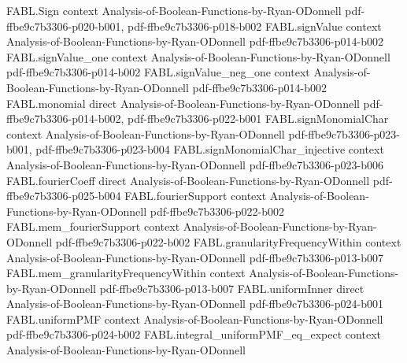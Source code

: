\begin{theorem}
\label{FABL.FiniteFourierBasis.fourierCoeff_coordinateProjection}
\leanok
{}
\proofstep
  {FABL.Sign}
  {context}
  {Analysis-of-Boolean-Functions-by-Ryan-ODonnell}
  {pdf-ffbe9c7b3306-p020-b001,
    pdf-ffbe9c7b3306-p018-b002}
\proofstep
  {FABL.signValue}
  {context}
  {Analysis-of-Boolean-Functions-by-Ryan-ODonnell}
  {pdf-ffbe9c7b3306-p014-b002}
\proofstep
  {FABL.signValue_one}
  {context}
  {Analysis-of-Boolean-Functions-by-Ryan-ODonnell}
  {pdf-ffbe9c7b3306-p014-b002}
\proofstep
  {FABL.signValue_neg_one}
  {context}
  {Analysis-of-Boolean-Functions-by-Ryan-ODonnell}
  {pdf-ffbe9c7b3306-p014-b002}
\proofstep
  {FABL.monomial}
  {direct}
  {Analysis-of-Boolean-Functions-by-Ryan-ODonnell}
  {pdf-ffbe9c7b3306-p014-b002,
    pdf-ffbe9c7b3306-p022-b001}
\proofstep
  {FABL.signMonomialChar}
  {context}
  {Analysis-of-Boolean-Functions-by-Ryan-ODonnell}
  {pdf-ffbe9c7b3306-p023-b001,
    pdf-ffbe9c7b3306-p023-b004}
\proofstep
  {FABL.signMonomialChar_injective}
  {context}
  {Analysis-of-Boolean-Functions-by-Ryan-ODonnell}
  {pdf-ffbe9c7b3306-p023-b006}
\proofstep
  {FABL.fourierCoeff}
  {direct}
  {Analysis-of-Boolean-Functions-by-Ryan-ODonnell}
  {pdf-ffbe9c7b3306-p025-b004}
\proofstep
  {FABL.fourierSupport}
  {context}
  {Analysis-of-Boolean-Functions-by-Ryan-ODonnell}
  {pdf-ffbe9c7b3306-p022-b002}
\proofstep
  {FABL.mem_fourierSupport}
  {context}
  {Analysis-of-Boolean-Functions-by-Ryan-ODonnell}
  {pdf-ffbe9c7b3306-p022-b002}
\proofstep
  {FABL.granularityFrequencyWithin}
  {context}
  {Analysis-of-Boolean-Functions-by-Ryan-ODonnell}
  {pdf-ffbe9c7b3306-p013-b007}
\proofstep
  {FABL.mem_granularityFrequencyWithin}
  {context}
  {Analysis-of-Boolean-Functions-by-Ryan-ODonnell}
  {pdf-ffbe9c7b3306-p013-b007}
\proofstep
  {FABL.uniformInner}
  {direct}
  {Analysis-of-Boolean-Functions-by-Ryan-ODonnell}
  {pdf-ffbe9c7b3306-p024-b001}
\proofstep
  {FABL.uniformPMF}
  {context}
  {Analysis-of-Boolean-Functions-by-Ryan-ODonnell}
  {pdf-ffbe9c7b3306-p024-b002}
\proofstep
  {FABL.integral_uniformPMF_eq_expect}
  {context}
  {Analysis-of-Boolean-Functions-by-Ryan-ODonnell}

\end{theorem}
